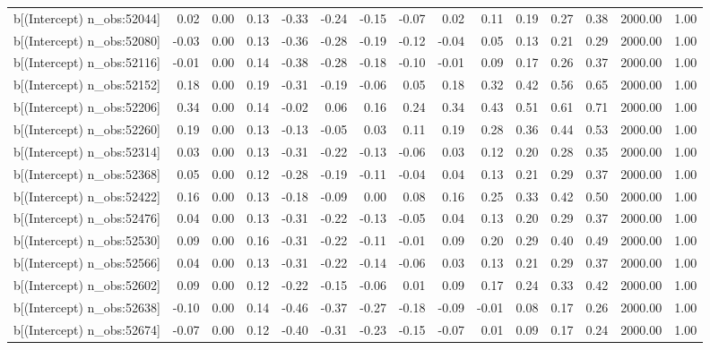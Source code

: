 \begin{table}[ht]
\begin{tabular}{rrrrrrrrrrrrrrr}
  b[(Intercept) n\_obs:52044] & 0.02 & 0.00 & 0.13 & -0.33 & -0.24 & -0.15 & -0.07 & 0.02 & 0.11 & 0.19 & 0.27 & 0.38 & 2000.00 & 1.00 \\ 
  b[(Intercept) n\_obs:52080] & -0.03 & 0.00 & 0.13 & -0.36 & -0.28 & -0.19 & -0.12 & -0.04 & 0.05 & 0.13 & 0.21 & 0.29 & 2000.00 & 1.00 \\ 
  b[(Intercept) n\_obs:52116] & -0.01 & 0.00 & 0.14 & -0.38 & -0.28 & -0.18 & -0.10 & -0.01 & 0.09 & 0.17 & 0.26 & 0.37 & 2000.00 & 1.00 \\ 
  b[(Intercept) n\_obs:52152] & 0.18 & 0.00 & 0.19 & -0.31 & -0.19 & -0.06 & 0.05 & 0.18 & 0.32 & 0.42 & 0.56 & 0.65 & 2000.00 & 1.00 \\ 
  b[(Intercept) n\_obs:52206] & 0.34 & 0.00 & 0.14 & -0.02 & 0.06 & 0.16 & 0.24 & 0.34 & 0.43 & 0.51 & 0.61 & 0.71 & 2000.00 & 1.00 \\ 
  b[(Intercept) n\_obs:52260] & 0.19 & 0.00 & 0.13 & -0.13 & -0.05 & 0.03 & 0.11 & 0.19 & 0.28 & 0.36 & 0.44 & 0.53 & 2000.00 & 1.00 \\ 
  b[(Intercept) n\_obs:52314] & 0.03 & 0.00 & 0.13 & -0.31 & -0.22 & -0.13 & -0.06 & 0.03 & 0.12 & 0.20 & 0.28 & 0.35 & 2000.00 & 1.00 \\ 
  b[(Intercept) n\_obs:52368] & 0.05 & 0.00 & 0.12 & -0.28 & -0.19 & -0.11 & -0.04 & 0.04 & 0.13 & 0.21 & 0.29 & 0.37 & 2000.00 & 1.00 \\ 
  b[(Intercept) n\_obs:52422] & 0.16 & 0.00 & 0.13 & -0.18 & -0.09 & 0.00 & 0.08 & 0.16 & 0.25 & 0.33 & 0.42 & 0.50 & 2000.00 & 1.00 \\ 
  b[(Intercept) n\_obs:52476] & 0.04 & 0.00 & 0.13 & -0.31 & -0.22 & -0.13 & -0.05 & 0.04 & 0.13 & 0.20 & 0.29 & 0.37 & 2000.00 & 1.00 \\ 
  b[(Intercept) n\_obs:52530] & 0.09 & 0.00 & 0.16 & -0.31 & -0.22 & -0.11 & -0.01 & 0.09 & 0.20 & 0.29 & 0.40 & 0.49 & 2000.00 & 1.00 \\ 
  b[(Intercept) n\_obs:52566] & 0.04 & 0.00 & 0.13 & -0.31 & -0.22 & -0.14 & -0.06 & 0.03 & 0.13 & 0.21 & 0.29 & 0.37 & 2000.00 & 1.00 \\ 
  b[(Intercept) n\_obs:52602] & 0.09 & 0.00 & 0.12 & -0.22 & -0.15 & -0.06 & 0.01 & 0.09 & 0.17 & 0.24 & 0.33 & 0.42 & 2000.00 & 1.00 \\ 
  b[(Intercept) n\_obs:52638] & -0.10 & 0.00 & 0.14 & -0.46 & -0.37 & -0.27 & -0.18 & -0.09 & -0.01 & 0.08 & 0.17 & 0.26 & 2000.00 & 1.00 \\ 
  b[(Intercept) n\_obs:52674] & -0.07 & 0.00 & 0.12 & -0.40 & -0.31 & -0.23 & -0.15 & -0.07 & 0.01 & 0.09 & 0.17 & 0.24 & 2000.00 & 1.00 \\ 

\end{tabular}
\end{table}

